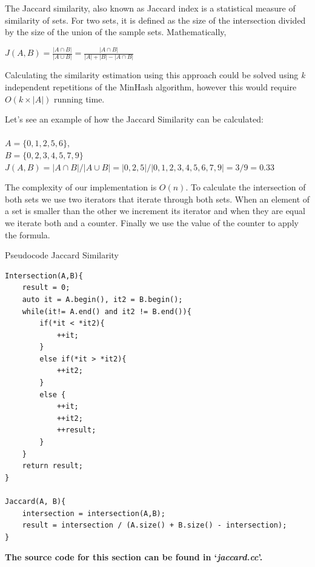 \documentclass[12pt]{article}
\begin{document}
The Jaccard similarity, also known as Jaccard index is a statistical measure of similarity of sets. For two sets, it is defined as the size of the intersection divided by the size of the union of the sample sets. Mathematically,
\bigbreak
\centerline{\large $J(A,B)=\frac{\left |A\cap B  \right |}{ \left |A\cup B  \right |} = \frac{\left |A\cap B  \right |}{ \left|A\right|+\left|B\right|-\left |A\cap B  \right |} $}
\bigbreak

Calculating the similarity estimation using this approach could be solved using \textit{k} independent repetitions of the MinHash algorithm, however this would require $O(k \times |A|)$ running time. \\\medskip

Let's see an example of how the Jaccard Similarity can be calculated: \\ \\
$A = \{0,1,2,5,6\}$,\\
$B = \{0,2,3,4,5,7,9\}$ \\
$J(A,B) = |A \cap  B| / |A \cup B| = |{0,2,5}| / |{0,1,2,3,4,5,6,7,9}| = 3/9 = 0.33$\\\medskip


The complexity of our implementation is $O(n)$. To calculate the intersection of both sets we use two iterators that iterate through both sets. When an element of a set is smaller than the other we increment its iterator and when they are equal we iterate both and a counter. Finally we use the value of the counter to apply the formula. 

\begin{center}
\begin{large}
Pseudocode Jaccard Similarity
\end{large}
\end{center}

\begin{lstlisting}
Intersection(A,B){
	result = 0; 
	auto it = A.begin(), it2 = B.begin();
	while(it!= A.end() and it2 != B.end()){
		if(*it < *it2){
			++it;
		}
		else if(*it > *it2){
			++it2;
		}
		else {
			++it;
			++it2;
			++result;
		}
	}
	return result; 
}

Jaccard(A, B){
	intersection = intersection(A,B);
	result = intersection / (A.size() + B.size() - intersection);
}

\end{lstlisting}

\textbf{The source code for this section can be found in `\textit{jaccard.cc}'.}
\bigskip
\end{document}
